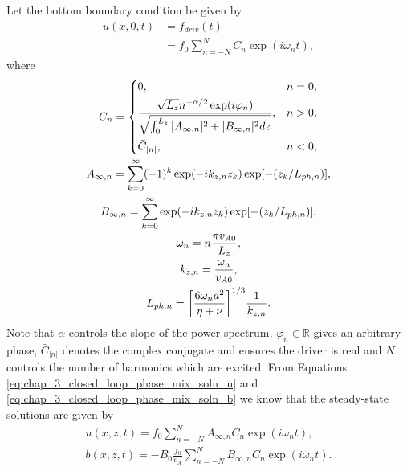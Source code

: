 Let the bottom boundary condition be given by
\begin{equation}
    \label{eq:driver_multiple_harmonics}
    \begin{aligned}
    u(x,0,t) &= f_{driv}(t)\\
    &=f_0 \sum_{n=-N}^N C_n \exp(i\omega_n t),
    \end{aligned}
\end{equation}
where
\begin{gather}
    C_n = \begin{dcases}
    0, & n=0, \\
    \frac{\sqrt{L_z} n^{-\alpha / 2}\exp(i\varphi_n)}{\sqrt{\int_0^{L_z} |A_{\infty,n}|^2 + |B_{\infty,n}|^2 dz}}, & n > 0, \\
   \bar{C}_{|n|}, & n < 0,
    \end{dcases} \\
    A_{\infty,n} = \sum_{k=0}^\infty(-1)^k\exp(-ik_{z,n}z_k)\exp[-(z_k / L_{ph,n})], \\
    B_{\infty,n} = \sum_{k=0}^\infty \exp(-ik_{z,n}z_k)\exp[-(z_k / L_{ph,n})], \\
    \omega_n = n\frac{\pi v_{A0}}{L_z}, \\
    k_{z,n} = \frac{\omega_n}{v_{A0}}, \\
    L_{ph,n} = \qty[\frac{6\omega_n a^2}{\eta+\nu}]^{1/3}\frac{1}{k_{z,n}}.
\end{gather}
Note that $\alpha$ controls the slope of the power spectrum, $\varphi_n\in\mathds{R}$ gives an arbitrary phase, $\bar{C}_{|n|}$ denotes the complex conjugate and ensures the driver is real and $N$ controls the number of harmonics which are excited. From Equations \eqref{eq:chap_3_closed_loop_phase_mix_soln_u} and \eqref{eq:chap_3_closed_loop_phase_mix_soln_b} we know that the steady-state solutions are given by
\begin{gather}
    u(x,z,t) = f_0\sum_{n=-N}^NA_{\infty,n}C_n\exp(i\omega_n t), \\
    b(x,z,t) = -B_0\frac{f_0}{v_A}\sum_{n=-N}^NB_{\infty,n}C_n\exp(i\omega_n t).
\end{gather}

